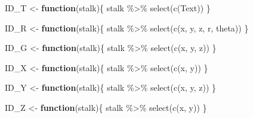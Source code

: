 \documentclass[
]{article}
\newenvironment{Shaded}{\begin{snugshade}}{\end{snugshade}}
\newcommand{\ControlFlowTok}[1]{\textcolor[rgb]{0.13,0.29,0.53}{\textbf{#1}}}
\newcommand{\FunctionTok}[1]{\textcolor[rgb]{0.00,0.00,0.00}{#1}}
\newcommand{\NormalTok}[1]{#1}
\newcommand{\OtherTok}[1]{\textcolor[rgb]{0.56,0.35,0.01}{#1}}
\newcommand{\SpecialCharTok}[1]{\textcolor[rgb]{0.00,0.00,0.00}{#1}}
\begin{document}
\begin{Shaded}
\begin{Highlighting}[]
\NormalTok{ID\_T }\OtherTok{\textless{}{-}} \ControlFlowTok{function}\NormalTok{(stalk)\{}
\NormalTok{  stalk }\SpecialCharTok{\%\textgreater{}\%}
    \FunctionTok{select}\NormalTok{(}\FunctionTok{c}\NormalTok{(Text))}
\NormalTok{\}}
\end{Highlighting}
\end{Shaded}

\begin{Shaded}
\begin{Highlighting}[]
\NormalTok{ID\_R }\OtherTok{\textless{}{-}} \ControlFlowTok{function}\NormalTok{(stalk)\{}
\NormalTok{  stalk }\SpecialCharTok{\%\textgreater{}\%}
    \FunctionTok{select}\NormalTok{(}\FunctionTok{c}\NormalTok{(x, y, z, r, theta))}
\NormalTok{\}}
\end{Highlighting}
\end{Shaded}

\begin{Shaded}
\begin{Highlighting}[]
\NormalTok{ID\_G }\OtherTok{\textless{}{-}} \ControlFlowTok{function}\NormalTok{(stalk)\{}
\NormalTok{  stalk }\SpecialCharTok{\%\textgreater{}\%}
    \FunctionTok{select}\NormalTok{(}\FunctionTok{c}\NormalTok{(x, y, z))}
\NormalTok{\}}
\end{Highlighting}
\end{Shaded}

\begin{Shaded}
\begin{Highlighting}[]
\NormalTok{ID\_X }\OtherTok{\textless{}{-}} \ControlFlowTok{function}\NormalTok{(stalk)\{}
\NormalTok{  stalk }\SpecialCharTok{\%\textgreater{}\%}
    \FunctionTok{select}\NormalTok{(}\FunctionTok{c}\NormalTok{(x, y))}
\NormalTok{\}}
\end{Highlighting}
\end{Shaded}

\begin{Shaded}
\begin{Highlighting}[]
\NormalTok{ID\_Y }\OtherTok{\textless{}{-}} \ControlFlowTok{function}\NormalTok{(stalk)\{}
\NormalTok{  stalk }\SpecialCharTok{\%\textgreater{}\%}
    \FunctionTok{select}\NormalTok{(}\FunctionTok{c}\NormalTok{(x, y, z))}
\NormalTok{\}}
\end{Highlighting}
\end{Shaded}

\begin{Shaded}
\begin{Highlighting}[]
\NormalTok{ID\_Z }\OtherTok{\textless{}{-}} \ControlFlowTok{function}\NormalTok{(stalk)\{}
\NormalTok{  stalk }\SpecialCharTok{\%\textgreater{}\%}
    \FunctionTok{select}\NormalTok{(}\FunctionTok{c}\NormalTok{(x, y))}
\NormalTok{\}}
\end{Highlighting}
\end{Shaded}
\end{document}

